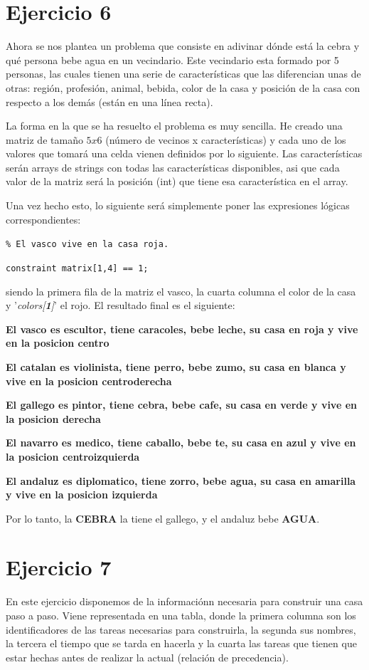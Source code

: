 \documentclass[11pt,a4paper]{article}
\begin{document}
\section*{Ejercicio 6}
Ahora se nos plantea un problema que consiste en adivinar dónde está la cebra y qué persona bebe agua en un vecindario. Este vecindario esta
formado por 5 personas, las cuales tienen una serie de características que las diferencian unas de otras: región, profesión, animal, bebida,
color de la casa y posición de la casa con respecto a los demás (están en una línea recta).

La forma en la que se ha resuelto el problema es muy sencilla. He creado una matriz de tamaño $5x6$ (número de vecinos x características) y
cada uno de los valores que tomará una celda vienen definidos por lo siguiente. Las características serán arrays de strings con todas las
características disponibles, asi que cada valor de la matriz será la posición (int) que tiene esa característica en el array.

Una vez hecho esto, lo siguiente será simplemente poner las expresiones lógicas correspondientes:

\texttt{\% El vasco vive en la casa roja.}

\vspace{-8px}

\texttt{constraint matrix[1,4] == 1;}

siendo la primera fila de la matriz el vasco, la cuarta columna el color de la casa y '\textit{colors[\textbf{1}]}' el rojo. El resultado final
es el siguiente:

\textbf{El vasco es escultor, tiene caracoles, bebe leche, su casa en roja y vive en la posicion centro}

\textbf{El catalan es violinista, tiene perro, bebe zumo, su casa en blanca y vive en la posicion  centroderecha}

\textbf{El gallego es pintor, tiene cebra, bebe cafe, su casa en verde y vive en la posicion derecha}

\textbf{El navarro es medico, tiene caballo, bebe te, su casa en azul y vive en la posicion centroizquierda}

\textbf{El andaluz es diplomatico, tiene zorro, bebe agua, su casa en amarilla y vive en la posicion izquierda}

Por lo tanto, la \textbf{CEBRA} la tiene el gallego, y el andaluz bebe \textbf{AGUA}.


\section*{Ejercicio 7}
En este ejercicio disponemos de la informaciónn necesaria para construir una casa paso a paso. Viene representada en una tabla, donde la primera
columna son los identificadores de las tareas necesarias para construirla, la segunda sus nombres, la tercera el tiempo que se tarda en hacerla
y la cuarta las tareas que tienen que estar hechas antes de realizar la actual (relación de precedencia).
\end{document}
